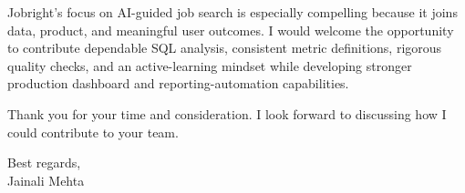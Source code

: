 \documentclass[letterpaper,11pt]{article}
\begin{document}
\bigbreak
Jobright's focus on AI-guided job search is especially compelling because it joins data, product, and meaningful user outcomes. I would welcome the opportunity to contribute dependable SQL analysis, consistent metric definitions, rigorous quality checks, and an active-learning mindset while developing stronger production dashboard and reporting-automation capabilities.

\bigbreak
Thank you for your time and consideration. I look forward to discussing how I could contribute to your team.

\bigbreak
Best regards,\\
Jainali Mehta
\end{document}
